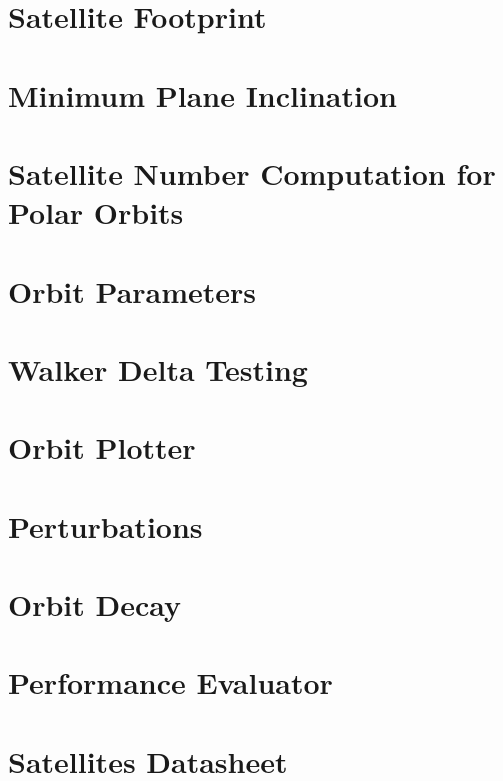 
\section{Satellite Footprint}
\label{SatFootprint}


\section{Minimum Plane Inclination}
\label{MinimumInclination}


\section{Satellite Number Computation for Polar Orbits}
\label{SatNumberPolar}


\section{Orbit Parameters}
\label{OrbitParameters}




\section{Walker Delta Testing}
\label{smartWD}


\section{Orbit Plotter}
\label{OrbitPlotter}






\section{Perturbations}
\label{Perturbation}



\section{Orbit Decay}
\label{OrbitDecay}



\section{Performance Evaluator}
\label{PerformanceEvaluator}


\section{Satellites Datasheet}
\label{SatsDatashhet}

